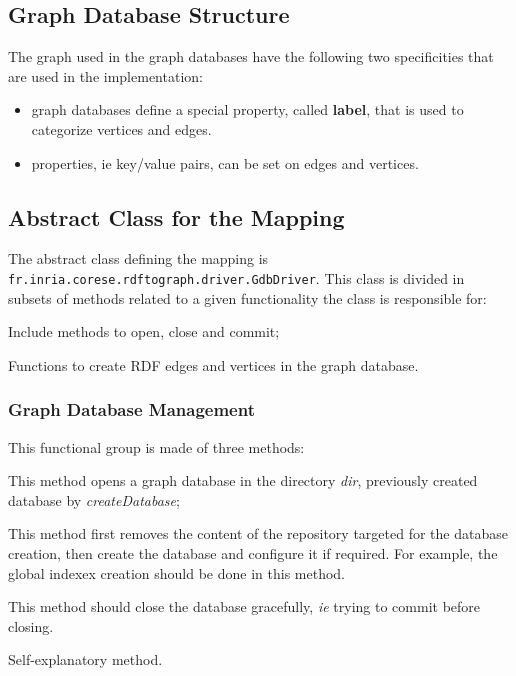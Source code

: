 \documentclass[12pt,a4paper]{memoir} %
\begin{document}
\subsection{Graph Database Structure}
The graph used in the graph databases have the following two specificities that are used in the implementation:
\begin{itemize}
\item graph databases define a special property, called \textbf{label}, that is used to categorize vertices and edges.
\item properties, ie key/value pairs, can be set on edges and vertices.
\end{itemize}


\subsection{Abstract Class for the Mapping}
The abstract class defining the mapping is \texttt{fr.inria.corese.rdftograph.driver.GdbDriver}.
This class is divided in subsets of methods related to a given functionality the class is responsible for:

\begin{description}[align=left]
	\item [Graph Database Management] Include methods to open, close and commit;
	\item [RDF Storage] Functions to create RDF edges and vertices in the graph database. 
\end{description}

\subsubsection{Graph Database Management}
This functional group is made of three methods: 
\begin{description}[align=left]
	\item[openDatabase(dir)] This method opens a graph database in the directory \textit{dir}, previously created database by \textit{createDatabase};
	\item[createDatabase] This method first removes the content of the repository targeted for the database creation, then create the database and configure it if required. For example, the global indexex creation should be done in this method. 
	\item[closeDatabase] This method should close the database gracefully, \textit{ie} trying to commit before closing. 
	\item[commit] Self-explanatory method.
\end{description}
\end{document}

